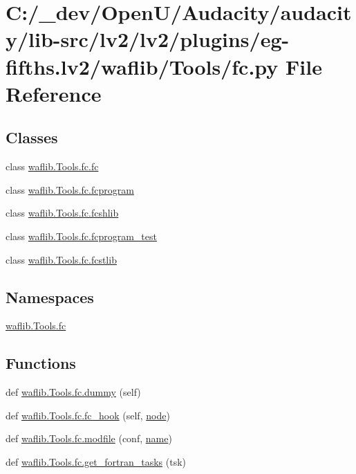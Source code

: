 \hypertarget{lv2_2plugins_2eg-fifths_8lv2_2waflib_2_tools_2fc_8py}{}\section{C\+:/\+\_\+dev/\+Open\+U/\+Audacity/audacity/lib-\/src/lv2/lv2/plugins/eg-\/fifths.lv2/waflib/\+Tools/fc.py File Reference}
\label{lv2_2plugins_2eg-fifths_8lv2_2waflib_2_tools_2fc_8py}
\subsection*{Classes}
\begin{DoxyCompactItemize}
\item 
class \hyperlink{classwaflib_1_1_tools_1_1fc_1_1fc}{waflib.\+Tools.\+fc.\+fc}
\item 
class \hyperlink{classwaflib_1_1_tools_1_1fc_1_1fcprogram}{waflib.\+Tools.\+fc.\+fcprogram}
\item 
class \hyperlink{classwaflib_1_1_tools_1_1fc_1_1fcshlib}{waflib.\+Tools.\+fc.\+fcshlib}
\item 
class \hyperlink{classwaflib_1_1_tools_1_1fc_1_1fcprogram__test}{waflib.\+Tools.\+fc.\+fcprogram\+\_\+test}
\item 
class \hyperlink{classwaflib_1_1_tools_1_1fc_1_1fcstlib}{waflib.\+Tools.\+fc.\+fcstlib}
\end{DoxyCompactItemize}
\subsection*{Namespaces}
\begin{DoxyCompactItemize}
\item 
 \hyperlink{namespacewaflib_1_1_tools_1_1fc}{waflib.\+Tools.\+fc}
\end{DoxyCompactItemize}
\subsection*{Functions}
\begin{DoxyCompactItemize}
\item 
def \hyperlink{namespacewaflib_1_1_tools_1_1fc_a27d355b521fb9e2bf9fa51b4c5b86a75}{waflib.\+Tools.\+fc.\+dummy} (self)
\item 
def \hyperlink{namespacewaflib_1_1_tools_1_1fc_a32c4c535596617f7d93fadd0607f18eb}{waflib.\+Tools.\+fc.\+fc\+\_\+hook} (self, \hyperlink{structnode}{node})
\item 
def \hyperlink{namespacewaflib_1_1_tools_1_1fc_ae8fd3a39f47bdf4cb2e5d16cbdacd4e0}{waflib.\+Tools.\+fc.\+modfile} (conf, \hyperlink{lib_2expat_8h_a1b49b495b59f9e73205b69ad1a2965b0}{name})
\item 
def \hyperlink{namespacewaflib_1_1_tools_1_1fc_a042f42940a7e5040b3d6e9c3dd3df7f4}{waflib.\+Tools.\+fc.\+get\+\_\+fortran\+\_\+tasks} (tsk)
\end{DoxyCompactItemize}
